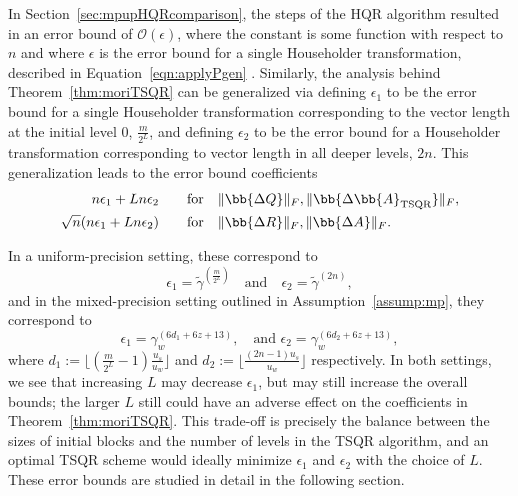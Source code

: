 In Section~\ref{sec:mpupHQRcomparison}, the steps of the HQR algorithm resulted in an error bound of  $\mathcal{O}(\epsilon)$, where the constant is some function with respect to $n$ and where $\epsilon$ is the error bound for a single Householder transformation, described in Equation~\ref{eqn:applyPgen} .
Similarly, the analysis behind Theorem~\ref{thm:moriTSQR} can be generalized via defining $\epsilon_1$ to be the error bound for a single Householder transformation corresponding to the vector length at the initial level $0$, $\frac{m}{2^L}$, and defining $\epsilon_2$ to be the error bound for a Householder transformation corresponding to vector length in all deeper levels,  $2n$.
This generalization leads to the error bound coefficients
\begin{align}
 n\epsilon_1 + Ln\epsilon_2& \qquad\text{for}\quad  \|\bb{\Delta Q}\|_F, \|\bb{\Delta \bb{A}_{\text{TSQR}}}\|_F,\\
 \sqrt{n}(n\epsilon_1+Ln\epsilon_2)& \qquad\text{for}\quad \|\bb{\Delta R}\|_F, \|\bb{\Delta A}\|_F.
\end{align}

In a uniform-precision setting, these correspond to
\begin{equation}
\epsilon_1 = \tilde{\gamma}^{(\frac{m}{2^L})}\quad \text{and}\quad \epsilon_2 = \tilde{\gamma}^{(2n)},
\end{equation}
and in the mixed-precision setting outlined in Assumption~\ref{assump:mp}, they correspond to
\begin{equation}
\epsilon_1 = \gamma_w^{(6d_1+6z+13)}, \quad \text{and } \epsilon_2 = \gamma_w^{(6d_2+6z+13)},
\end{equation}
where $d_1 := \lfloor{(\frac{m}{2^L}-1)\frac{u_s}{u_w}\rfloor}$ and $d_2 :=\lfloor \frac{(2n-1)u_s}{u_w}\rfloor$ respectively.
In both settings, we see that increasing $L$ may decrease $\epsilon_1$, but may still increase the overall bounds; the larger $L$ still could have an adverse effect on the coefficients in Theorem~\ref{thm:moriTSQR}.
This trade-off is precisely the balance between the sizes of initial blocks and the number of levels in the TSQR algorithm, and an optimal TSQR scheme would ideally minimize $\epsilon_1$ and $\epsilon_2$ with the choice of $L$.
These error bounds are studied in detail in the following section. %

